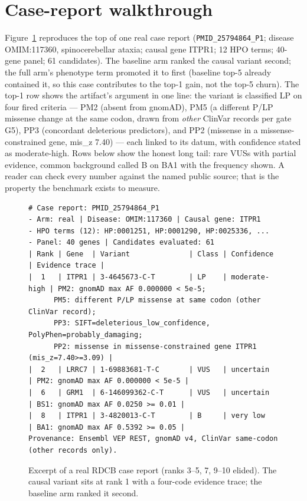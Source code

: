 \documentclass[11pt]{article}
\begin{document}
\section{Case-report walkthrough}
\label{sec:walk}
Figure~\ref{fig:walk} reproduces the top of one real case report
(\texttt{PMID\_25794864\_P1}; disease OMIM:117360, spinocerebellar ataxia; causal
gene ITPR1; 12 HPO terms; 40-gene panel; 61 candidates). The baseline arm ranked
the causal variant second; the full arm's phenotype term promoted it to first
(baseline top-5 already contained it, so this case contributes to the top-1 gain,
not the top-5 churn). The top-1 row shows the artifact's argument in one line: the
variant is classified LP on four fired criteria --- PM2 (absent from gnomAD),
PM5 (a different P/LP missense change at the same codon, drawn from \emph{other}
ClinVar records per gate G5), PP3 (concordant deleterious predictors), and PP2
(missense in a missense-constrained gene, mis\_z 7.40) --- each linked to its datum,
with confidence stated as moderate-high. Rows below show the honest long tail: rare
VUSs with partial evidence, common background called B on BA1 with the frequency
shown. A reader can check every number against the named public source; that is the
property the benchmark exists to measure.

\begin{figure}[tb!]
\begin{center}\begin{minipage}{0.98\textwidth}\scriptsize\begin{verbatim}
# Case report: PMID_25794864_P1
- Arm: real | Disease: OMIM:117360 | Causal gene: ITPR1
- HPO terms (12): HP:0001251, HP:0001290, HP:0025336, ...
- Panel: 40 genes | Candidates evaluated: 61
| Rank | Gene  | Variant              | Class | Confidence    | Evidence trace |
|  1   | ITPR1 | 3-4645673-C-T        | LP    | moderate-high | PM2: gnomAD max AF 0.000000 < 5e-5;
      PM5: different P/LP missense at same codon (other ClinVar record);
      PP3: SIFT=deleterious_low_confidence, PolyPhen=probably_damaging;
      PP2: missense in missense-constrained gene ITPR1 (mis_z=7.40>=3.09) |
|  2   | LRRC7 | 1-69883681-T-C       | VUS   | uncertain     | PM2: gnomAD max AF 0.000000 < 5e-5 |
|  6   | GRM1  | 6-146099362-C-T      | VUS   | uncertain     | BS1: gnomAD max AF 0.0250 >= 0.01 |
|  8   | ITPR1 | 3-4820013-C-T        | B     | very low      | BA1: gnomAD max AF 0.5392 >= 0.05 |
Provenance: Ensembl VEP REST, gnomAD v4, ClinVar same-codon (other records only).
\end{verbatim}\end{minipage}\end{center}
\caption{Excerpt of a real RDCB case report (ranks 3--5, 7, 9--10 elided). The
causal variant sits at rank 1 with a four-code evidence trace; the baseline arm
ranked it second.}
\label{fig:walk}
\end{figure}
\end{document}

